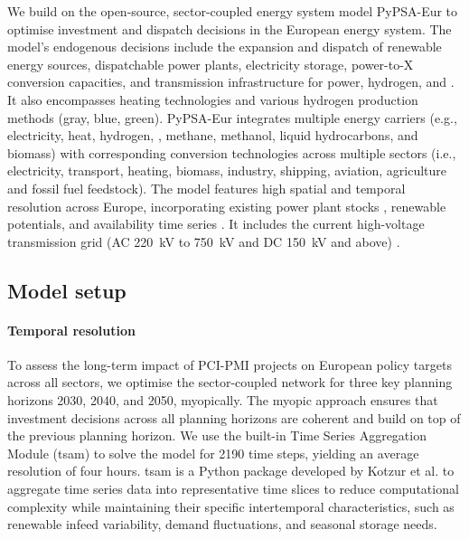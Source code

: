 \documentclass[preprint,12pt,sort&compress]{elsarticle}
\begin{document}
We build on the open-source, sector-coupled energy system model PyPSA-Eur \cite{neumannPotentialRoleHydrogen2023,frysztackiComparisonClusteringMethods2022,glaumOffshorePowerHydrogen2024,horschPyPSAEurOpenOptimisation2018} to optimise investment and dispatch decisions in the European energy system. The model's endogenous decisions include the expansion and dispatch of renewable energy sources, dispatchable power plants, electricity storage, power-to-X conversion capacities, and transmission infrastructure for power, hydrogen, and . It also encompasses heating technologies and various hydrogen production methods (gray, blue, green).
PyPSA-Eur integrates multiple energy carriers (e.g., electricity, heat, hydrogen, , methane, methanol, liquid hydrocarbons, and biomass) with corresponding conversion technologies across multiple sectors (i.e., electricity, transport, heating, biomass, industry, shipping, aviation, agriculture and fossil fuel feedstock). The model features high spatial and temporal resolution across Europe, incorporating existing power plant stocks \cite{gotzensPerformingEnergyModelling2019}, renewable potentials, and availability time series \cite{hofmannAtliteLightweightPython2021}. It includes the current high-voltage transmission grid (AC \SI{220}{kV} to \SI{750}{kV} and DC \SI{150}{kV} and above) \cite{xiongModellingHighvoltageGrid2025}.

\subsection{Model setup}
\label{sec:model_setup}


\paragraph{Temporal resolution}
\label{sec:temporal_resolution}
To assess the long-term impact of PCI-PMI projects on European policy targets across all sectors, we optimise the sector-coupled network for three key planning horizons 2030, 2040, and 2050, myopically. The myopic approach ensures that investment decisions across all planning horizons are coherent and build on top of the previous planning horizon. We use the built-in Time Series Aggregation Module (tsam) to solve the model for 2190 time steps, yielding an average resolution of four hours. tsam is a Python package developed by Kotzur et al. \cite{kotzurImpactDifferentTime2018} to aggregate time series data into representative time slices to reduce computational complexity while maintaining their specific intertemporal characteristics, such as renewable infeed variability, demand fluctuations, and seasonal storage needs.
\end{document}
